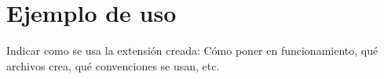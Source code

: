 \chapter{Ejemplo de uso}
\label{anx:ejemplo}

Indicar como se usa la extensión creada: Cómo poner en funcionamiento, qué archivos crea, qué convenciones se usan, etc.
